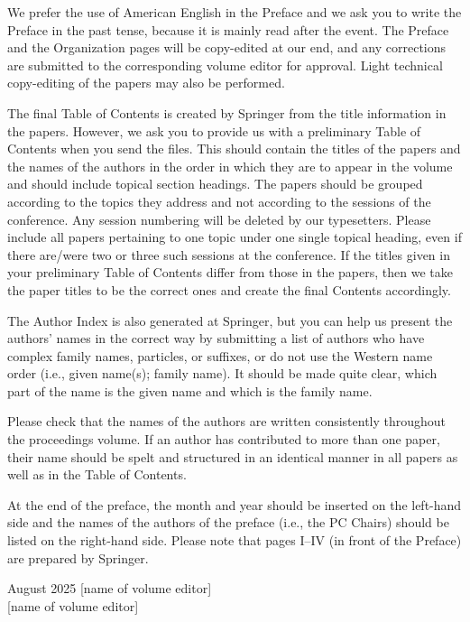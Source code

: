 \documentclass[runningheads]{llncs}
\begin{document}
We prefer the use of American English in the Preface and we ask you to write
the Preface in the past tense, because it is mainly read after the event. The
Preface and the Organization pages will be copy-edited at our end, and any
corrections are submitted to the corresponding volume editor for approval.
Light technical copy-editing of the papers may also be performed.

The final Table of Contents is created by Springer from the title information
in the papers. However, we ask you to provide us with a preliminary Table of
Contents when you send the files. This should contain the titles of the
papers and the names of the authors in the order in which they are to appear
in the volume and should include topical section headings. The papers should
be grouped according to the topics they address and not according to the
sessions of the conference. Any session numbering will be deleted by our
typesetters. Please include all papers pertaining to one topic under one
single topical heading, even if there are/were two or three such sessions at
the conference. If the titles given in your preliminary Table of Contents
differ from those in the papers, then we take the paper titles to be the
correct ones and create the final Contents accordingly.

The Author Index is also generated at Springer, but you can help us present
the authors’ names in the correct way by submitting a list of authors who
have complex family names, particles, or suffixes, or do not use the Western
name order (i.e., given name(s); family name). It should be made quite clear,
which part of the name is the given name and which is the family name.

Please check that the names of the authors are written consistently
throughout the proceedings volume. If an author has contributed to more than
one paper, their name should be spelt and structured in an identical manner
in all papers as well as in the Table of Contents.

At the end of the preface, the month and year should be inserted on the
left-hand side and the names of the authors of the preface (i.e., the PC
Chairs) should be listed on the right-hand side. Please note that pages I--IV
(in front of the Preface) are prepared by Springer.
\medskip

\begin{flushright}
\noindent August 2025\hfill
{[name of volume editor]}\\
{[name of volume editor]}
\end{flushright}
\end{document}
